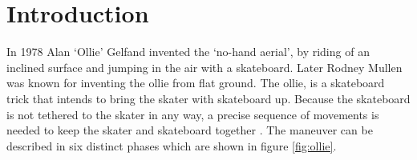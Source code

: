 \documentclass[default,iicol]{sn-jnl}
\theoremstyle{thmstyleone}%
\theoremstyle{thmstyletwo}%
\theoremstyle{thmstylethree}%
\begin{document}

\maketitle

\section{Introduction}\label{s_intro}

In 1978 Alan `Ollie' Gelfand invented the `no-hand aerial', by riding of an inclined surface and jumping in the air with a skateboard. Later Rodney Mullen was known for inventing the ollie from flat ground. The ollie, is a skateboard trick that intends to bring the skater with skateboard up. Because the skateboard is not tethered to the skater in any way, a precise sequence of movements is needed to keep the skater and skateboard together \cite{frederick_biomechanics_2006}. The maneuver can be described in six distinct phases which are shown in figure \ref{fig:ollie}. 
\end{document}
